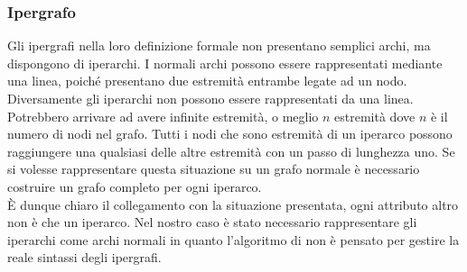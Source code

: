 \subsubsection*{Ipergrafo}
Gli ipergrafi nella loro definizione formale non presentano semplici archi, ma dispongono di iperarchi. I normali archi possono essere rappresentati mediante una linea, poiché presentano due estremità entrambe legate ad un nodo. Diversamente gli iperarchi non possono essere rappresentati da una linea. Potrebbero arrivare ad avere infinite estremità, o meglio $n$ estremità dove $n$ è il numero di nodi nel grafo. Tutti i nodi che sono estremità di un iperarco possono raggiungere una qualsiasi delle altre estremità con un passo di lunghezza uno. Se si volesse rappresentare questa situazione su un grafo normale è necessario costruire un grafo completo per ogni iperarco.\\
È dunque chiaro il collegamento con la situazione presentata, ogni attributo altro non è che un iperarco. Nel nostro caso è stato necessario rappresentare gli iperarchi come archi normali in quanto l'algoritmo di \nv non è pensato per gestire la reale sintassi degli ipergrafi.
%
%
